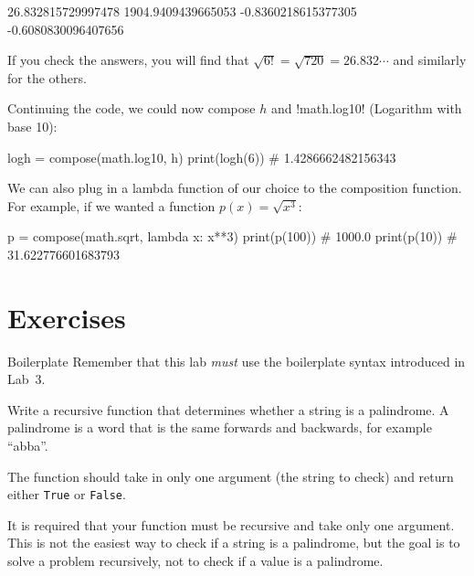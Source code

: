 \documentclass[11pt]{cselabheader}
\begin{document}
\begin{verbatimcode}
26.832815729997478
1904.9409439665053
-0.8360218615377305
-0.6080830096407656
\end{verbatimcode}

If you check the answers, you will find that $\sqrt{ 6! } = \sqrt{ 720 } =
26.832\cdots$ and similarly for the others.

Continuing the code, we could now compose $h$ and \pythoninline!math.log10!
(Logarithm with base 10):
\begin{python3code}
logh = compose(math.log10, h)
print(logh(6)) # 1.4286662482156343
\end{python3code}

We can also plug in a lambda function of our choice to the composition function.
For example, if we wanted a function $p(x) = \sqrt{ x^3 }$:
\begin{python3code}
p = compose(math.sqrt, lambda x: x**3)
print(p(100)) # 1000.0
print(p(10)) # 31.622776601683793
\end{python3code}

\pagebreak

\section{Exercises}
\label{sec:ex}

\begin{warningbox}{Boilerplate}
  Remember that this lab \emph{must} use the
  boilerplate syntax introduced in Lab~3.
\end{warningbox}

\begin{ex}[palindrome.py] Write a recursive function that determines whether a
    string is a palindrome. A palindrome is a word that is the same forwards and
    backwards, for example ``abba''.

    The function should take in only one argument (the string to check) and
    return either \lstinline{True} or \lstinline{False}.
    
    It is required that your function must be recursive and take only one argument.
    This is not the easiest way to check if a string is a palindrome, but the goal
    is to solve a problem recursively, not to check if a value is a palindrome.
\end{ex}
\end{document}
